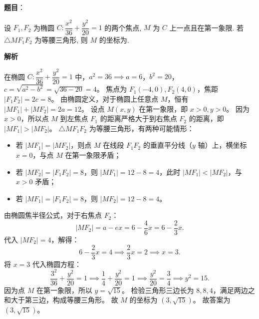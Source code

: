 \begin{answer}

\textbf{题目}：

设 $F_1, F_2$ 为椭圆 $C: \dfrac{x^2}{36} + \dfrac{y^2}{20} = 1$ 的两个焦点, $M$ 为 $C$ 上一点且在第一象限. 若 $\triangle MF_1F_2$ 为等腰三角形, 则 $M$ 的坐标为\gkblank{}.

\textbf{解析}

在椭圆 $C: \dfrac{x^2}{36} + \dfrac{y^2}{20} = 1$ 中，$a^2 = 36 \implies a = 6$，$b^2 = 20$，
$c = \sqrt{a^2 - b^2} = \sqrt{36 - 20} = 4$。
焦点为 $F_1(-4, 0), F_2(4, 0)$，焦距 $|F_1F_2| = 2c = 8$。
由椭圆定义，对于椭圆上任意点 $M$，恒有 $|MF_1| + |MF_2| = 2a = 12$。
设点 $M(x, y)$ 在第一象限，即 $x > 0, y > 0$。
因为 $x > 0$，所以点 $M$ 到左焦点 $F_1$ 的距离严格大于到右焦点 $F_2$ 的距离，即 $|MF_1| > |MF_2|$。
$\triangle MF_1F_2$ 为等腰三角形，有两种可能情形：
\begin{itemize}
\item 若 $|MF_1| = |MF_2|$，则点 $M$ 在线段 $F_1F_2$ 的垂直平分线（$y$ 轴）上，横坐标 $x = 0$，与点 $M$ 在第一象限矛盾；
\item 若 $|MF_2| = |F_1F_2| = 8$，则 $|MF_1| = 12 - 8 = 4$，此时 $|MF_1| < |MF_2|$，与 $x > 0$ 矛盾；
\item 若 $|MF_1| = |F_1F_2| = 8$，则 $|MF_2| = 12 - 8 = 4$。
\end{itemize}
由椭圆焦半径公式，对于右焦点 $F_2$：
\nopagebreak[4]
\[|MF_2| = a - ex = 6 - \frac{4}{6} x = 6 - \frac{2}{3} x.\]
代入 $|MF_2| = 4$，解得：
\nopagebreak[4]
\[6 - \frac{2}{3} x = 4 \implies \frac{2}{3} x = 2 \implies x = 3.\]
将 $x = 3$ 代入椭圆方程：
\nopagebreak[4]
\[\frac{3^2}{36} + \frac{y^2}{20} = 1 \implies \frac{1}{4} + \frac{y^2}{20} = 1 \implies \frac{y^2}{20} = \frac{3}{4} \implies y^2 = 15.\]
因为点 $M$ 在第一象限，所以 $y = \sqrt{15}$。
检验三角形三边长为 $8, 8, 4$，满足两边之和大于第三边，构成等腰三角形。
故 $M$ 的坐标为 $(3, \sqrt{15})$。
故答案为 $(3, \sqrt{15})$。


\end{answer}
